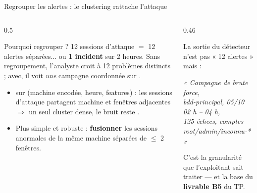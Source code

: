 \begin{frame}{Regrouper les alertes : le clustering rattache l'attaque}
\begin{columns}[t]
\begin{column}{0.5\textwidth}
\begin{block}{Pourquoi regrouper ?}
12 sessions d'attaque $=$ 12 alertes séparées... ou \textbf{1 incident} sur
2 heures. Sans regroupement, l'analyste croit à 12 problèmes distincts ;
avec, il voit \emph{une} campagne coordonnée sur .
\end{block}
\begin{itemize}
\item {} sur (machine encodée, heure, features) : les sessions
d'attaque partagent machine et fenêtres adjacentes $\Rightarrow$ un seul
cluster dense, le bruit reste .
\item Plus simple et robuste : \textbf{fusionner} les sessions anormales de
la même machine séparées de $\le$ 2 fenêtres.
\end{itemize}
\end{column}
\begin{column}{0.46\textwidth}
\begin{kbox}
La sortie du détecteur n'est pas « 12 alertes » mais :
\begin{center}
\emph{« Campagne de brute force,\\ bdd-principal, 05/10 02 h -- 04 h,\\
125 échecs, comptes root/admin/inconnu-* »}
\end{center}
C'est la granularité que l'exploitant sait traiter --- et la base du
\textbf{livrable B5} du TP.
\end{kbox}
\end{column}
\end{columns}
\end{frame}

